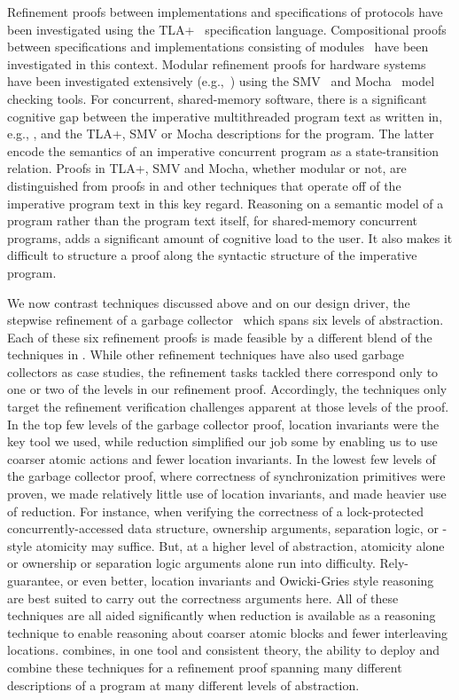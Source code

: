 Refinement proofs
between implementations and specifications of protocols have been
investigated using the TLA+~\cite{Lamport2004} specification
language. 
Compositional proofs between specifications and
implementations consisting of modules~\cite{AbadiAssumeGuarantee} have
been investigated in this context. 
Modular refinement proofs for hardware systems have been investigated extensively
(e.g.,~\cite{Henzinger1999,Eiriksson2000}) using the SMV~\cite{McMillan00} and Mocha~\cite{AlurHMQRT98} 
model checking tools.
For concurrent, shared-memory
software, there is a significant cognitive gap between the imperative
multithreaded program text as written in, e.g., \civl, and the TLA+,
SMV or Mocha descriptions for the program. The latter encode the
semantics of an imperative concurrent program as a
state-transition relation. 
Proofs in TLA+, SMV and Mocha, whether modular or not, are
distinguished from proofs in \civl and other techniques that operate
off of the imperative program text in this key regard. 
Reasoning on a
semantic model of a program rather than the program text itself, for
shared-memory concurrent programs, adds a significant amount of
cognitive load to the user. 
It also makes it difficult to structure a
proof along the syntactic structure of the imperative program. 

We now contrast techniques discussed above and \civl on our design
driver, the stepwise refinement of a garbage collector~\cite{gc-techreport} which spans six levels of abstraction.
Each of these six refinement proofs is made feasible by a different
blend of the techniques in \civl. 
While other refinement techniques have also used garbage collectors as
case studies, the refinement tasks tackled there correspond only to one or two of the levels in 
our refinement proof. 
Accordingly, the techniques only target the refinement verification
challenges apparent at those levels of the proof. 
In the top few levels of the garbage collector proof, location
invariants were the key tool we used, while reduction simplified our
job some by enabling us to use coarser atomic actions and fewer
location invariants.  
In the lowest few levels of the garbage collector proof, where
correctness of synchronization primitives were proven, we made
relatively little use of location invariants, and made heavier use of
reduction.
For instance, when verifying the correctness of a
lock-protected concurrently-accessed data structure, ownership
arguments, separation logic, or \QED-style atomicity may suffice. 
But,
at a higher level of abstraction, atomicity alone or ownership or
separation logic arguments alone run into difficulty. 
Rely-guarantee,
or even better, location invariants and Owicki-Gries style reasoning
are best suited to carry out the correctness arguments here. 
All of these
techniques are all aided significantly when reduction is available as
a reasoning technique to enable reasoning about coarser atomic blocks
and fewer interleaving locations. 
\civl combines, in one tool and consistent theory, the ability to
deploy and combine these techniques for a refinement proof spanning
many different descriptions of a program at many different levels of
abstraction. 

